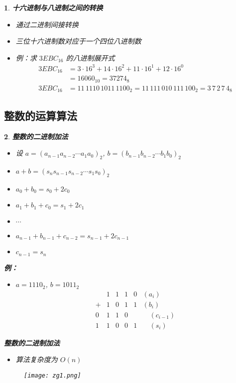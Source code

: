 \documentclass[UTF8]{report}
\theoremstyle{MyLineTheoremStyle} %
\theoremstyle{MyBlockTheoremStyle} %
\theoremstyle{MySubsubsectionStyle} %
\newtheorem{definition}{}
\begin{document}
\begin{definition}
    \textbf{十六进制与八进制之间的转换}
    \begin{itemize}
        \item 通过二进制间接转换
        \item 三位十六进制数对应于一个四位八进制数
        \item 例：求 $3EBC_{16}$ 的八进制展开式
        \begin{align*}
        3EBC_{16} &= 3 \cdot 16^3 + 14 \cdot 16^2 + 11 \cdot 16^1 + 12 \cdot 16^0 \\
        &= 16060_{10} = 37274_8 \\
        3EBC_{16} &= 11\,1110\,1011\,1100_2 = 11\,111\,010\,111\,100_2 = 3\,7\,2\,7\,4_8
        \end{align*}
    \end{itemize}
\end{definition}

\subsection{整数的运算算法}

\begin{definition}
    \textbf{整数的二进制加法}
    \begin{itemize}
        \item 设 $a = (a_{n-1}a_{n-2} \cdots a_1a_0)_2$, $b = (b_{n-1}b_{n-2} \cdots b_1b_0)_2$
        \item $a + b = (s_ns_{n-1}s_{n-2} \cdots s_1s_0)_2$
        \item $a_0 + b_0 = s_0 + 2c_0$
        \item $a_1 + b_1 + c_0 = s_1 + 2c_1$
        \item $\cdots$
        \item $a_{n-1} + b_{n-1} + c_{n-2} = s_{n-1} + 2c_{n-1}$
        \item $c_{n-1} = s_n$
    \end{itemize}

    \textbf{例：}
    \begin{itemize}
        \item $a = 1110_2$, $b = 1011_2$
        \[
    \begin{array}{cccccc}
      & 1 & 1 & 1 & 0 & (a_i) \\
    + & 1 & 0 & 1 & 1 & (b_i) \\
    \hline
    0 & 1 & 1 & 0 &   & \quad (c_{i-1}) \\
    1 & 1 & 0 & 0 & 1 & \quad (s_i)
    \end{array}
    \]
    \end{itemize}

    \textbf{整数的二进制加法}
    \begin{itemize}
        \item 算法复杂度为 $O(n)$
    \end{itemize}
    \begin{figure}[ht]
        \centering
        \texttt{[image: zg1.png]}
    \end{figure}
\end{definition}
\end{document}
